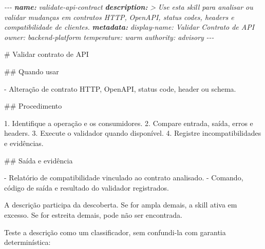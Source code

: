 \documentclass[
  10pt,
  a4paper,
  oneside]{book}
\newenvironment{Shaded}{}{}
\newcommand{\AnnotationTok}[1]{\textcolor[rgb]{0.38,0.63,0.69}{\textbf{\textit{#1}}}}
\newcommand{\CommentTok}[1]{\textcolor[rgb]{0.38,0.63,0.69}{\textit{#1}}}
\newcommand{\FunctionTok}[1]{\textcolor[rgb]{0.02,0.16,0.49}{#1}}
\newcommand{\NormalTok}[1]{#1}
\newcommand{\SpecialStringTok}[1]{\textcolor[rgb]{0.73,0.40,0.53}{#1}}
\begin{document}
\begin{Shaded}
\begin{Highlighting}[]
\CommentTok{{-}{-}{-}}
\AnnotationTok{name:}\CommentTok{ validate{-}api{-}contract}
\AnnotationTok{description:}\CommentTok{ \textgreater{}}
\CommentTok{  Use esta skill para analisar ou validar mudanças em contratos HTTP,}
\CommentTok{  OpenAPI, status codes, headers e compatibilidade de clientes.}
\AnnotationTok{metadata:}
\CommentTok{  display{-}name: Validar Contrato de API}
\CommentTok{  owner: backend{-}platform}
\CommentTok{  temperature: warm}
\CommentTok{  authority: advisory}
\CommentTok{{-}{-}{-}}

\FunctionTok{\# Validar contrato de API}

\FunctionTok{\#\# Quando usar}

\SpecialStringTok{{-} }\NormalTok{Alteração de contrato HTTP, OpenAPI, status code, header ou schema.}

\FunctionTok{\#\# Procedimento}

\SpecialStringTok{1. }\NormalTok{Identifique a operação e os consumidores.}
\SpecialStringTok{2. }\NormalTok{Compare entrada, saída, erros e headers.}
\SpecialStringTok{3. }\NormalTok{Execute o validador quando disponível.}
\SpecialStringTok{4. }\NormalTok{Registre incompatibilidades e evidências.}

\FunctionTok{\#\# Saída e evidência}

\SpecialStringTok{{-} }\NormalTok{Relatório de compatibilidade vinculado ao contrato analisado.}
\SpecialStringTok{{-} }\NormalTok{Comando, código de saída e resultado do validador registrados.}
\end{Highlighting}
\end{Shaded}

A descrição participa da descoberta. Se for ampla demais, a skill ativa
em excesso. Se for estreita demais, pode não ser encontrada.

Teste a descrição como um classificador, sem confundi-la com garantia
determinística:
\end{document}
